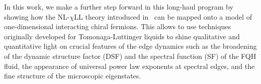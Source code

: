 \documentclass[twocolumn,pra,superscriptaddress,noshowpacs]{revtex4}
\newcommand{\nlchill}{NL-$\chi$LL }
\begin{document}
In this work, we make a further step forward in this long-haul program by showing how the \nlchill theory introduced in~\cite{Nardin_PRA_2023} can be mapped onto a model of one-dimensional interacting chiral fermions. This allows to use techniques originally developed for Tomonaga-Luttinger liquids to shine qualitative and quantitative light on crucial features of the edge dynamics such as the broadening of the dynamic structure factor (DSF) and the spectral function (SF) of the FQH fluid, the appearance of universal power law exponents at spectral edges, and the fine structure of the microscopic eigenstates. 


\end{document}
